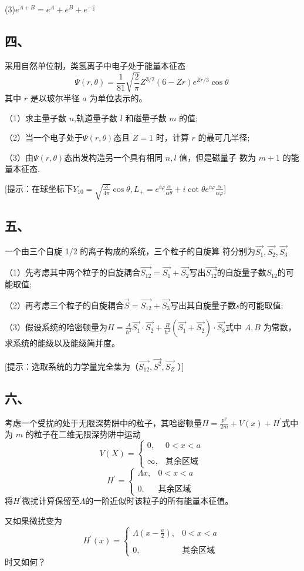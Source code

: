 (3)$e^{A+B} =e^A+e^B+e^{-\frac{c}{2}}$ 
\subsection{四、}

采用自然单位制，类氢离子中电子处于能量本征态
$$\Psi(r,\theta)=\frac{1}{81}\sqrt{\frac{2}{\pi}}Z^{3/2}(6-Zr)e^{Zr/3}\cos\theta~$$
其中 $r$ 是以玻尔半径 $a$ 为单位表示的。

（1）求主量子数 $n$,轨道量子数 $l$ 和磁量子数 $m$ 的值;

（2）当一个电子处于$\Psi(r,\theta)$态且 $Z=1$ 时，计算 $r$ 的最可几半径;

（3）由$\Psi(r,\theta)$态出发构造另一个具有相同 $n,l$ 值，但是磁量子
数为 $m+1$ 的能量本征态.

[提示：在球坐标下$Y_{10}=\sqrt{\frac{3}{4 \pi}}\cos\theta,L_+=e^{i\varphi}\frac{\alpha}{\alpha\theta}+i\cot\theta e^{i\varphi}\frac{\alpha}{\alpha\varphi}$]
\subsection{五、}
一个由三个自旋 1/2 的离子构成的系统，三个粒子的自旋算
符分别为$\vec{S_1},\vec{S_2},\vec{S_3}$

（1）先考虑其中两个粒子的自旋耦合$\vec{S_{12}}=\vec{S_1}+\vec{S_2}$写出$\vec{S_{12}}$⃗的自旋量子数$S_{12}$的可能取值;

（2）再考虑三个粒子的自旋耦合$\vec{S}=\vec{S_12}+\vec{S_3}$写出其自旋量子数$s$的可能取值;

（3）假设系统的哈密顿量为$H=\frac{A}{\hbar^2}\vec{S_1}\cdot\vec{S_2}+\frac{B}{\hbar^2}(\vec{S_1}+\vec{S_2})\cdot\vec{S_3}$式中 $A,B$ 为常数，求系统的能级以及能级简并度。

[提示：选取系统的力学量完全集为（$\vec{S_{12}} , \vec{S^2}  , \vec{S_Z}$ ）]
\subsection{六、}
考虑一个受扰的处于无限深势阱中的粒子，其哈密顿量$H=\frac{p^2}{2m}+V(x)+H^\prime$式中为 $m$ 的粒子在二维无限深势阱中运动
$$V(X)=\begin{cases}
0,&0 < x < a\\\\
\infty,&\text{其余区域}
\end{cases}~$$
$$H^\prime=\begin{cases}
\Lambda x ,&0 < x < a\\\\
0,&\text{其余区域}
\end{cases}~$$
将$H^\prime$微扰计算保留至$\Lambda$的一阶近似时该粒子的所有能量本征值。

又如果微扰变为$$H^\prime(x)=\begin{cases}
\Lambda (x-\frac{a}{2} ),&0 < x < a\\\\
0,&\text{其余区域}
\end{cases}~$$时又如何？